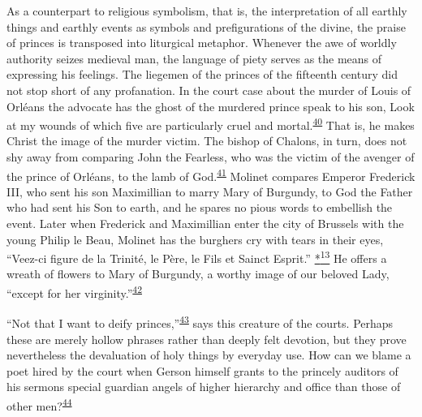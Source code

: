 As a counterpart to religious symbolism, that is, the interpretation of
all earthly things and earthly events as symbols and prefigurations of
the divine, the praise of princes is transposed into liturgical
metaphor. Whenever the awe of worldly authority seizes medieval man, the
language of piety serves as the means of expressing his feelings. The
liegemen of the princes of the fifteenth century did not stop short of
any profanation. In the court case about the murder of Louis of Orléans
the advocate has the ghost of the murdered prince speak to his son, Look
at my wounds of which five are particularly cruel and
mortal.\textsuperscript{\protect\hypertarget{13_Chapter_Six__THE_DEPICTION_OF_TH.xhtmlux5cux23id_1191}{\protect\hyperlink{23_NOTES.xhtmlux5cux23id_1192}{40}}}
That is, he makes Christ the image of the murder victim. The bishop of
Chalons, in turn, does not shy away from comparing John the Fearless,
who was the victim of the avenger of the prince of Orléans, to the lamb
of
God.\textsuperscript{\protect\hypertarget{13_Chapter_Six__THE_DEPICTION_OF_TH.xhtmlux5cux23id_1189}{\protect\hyperlink{23_NOTES.xhtmlux5cux23id_1190}{41}}}
Molinet compares Emperor Frederick III, who sent his son Maximillian to
marry Mary of Burgundy, to God the Father who had sent his Son to earth,
and he spares no pious words to embellish the event. Later when
Frederick and Maximillian enter the city of Brussels with the young
Philip le Beau, Molinet has the burghers cry with tears in their eyes,
``Veez-ci figure de la Trinité, le Père, le Fils et Sainct Esprit.''
\protect\hypertarget{13_Chapter_Six__THE_DEPICTION_OF_TH.xhtmlux5cux23id_3013}{\protect\hyperlink{23_NOTES.xhtmlux5cux23id_3014}{*\textsuperscript{13}}}
He offers a wreath of flowers to Mary of Burgundy, a worthy image of our
beloved Lady, ``except for her
virginity.''\textsuperscript{\protect\hypertarget{13_Chapter_Six__THE_DEPICTION_OF_TH.xhtmlux5cux23id_1187}{\protect\hyperlink{23_NOTES.xhtmlux5cux23id_1188}{42}}}

``Not that I want to deify
princes,''\textsuperscript{\protect\hypertarget{13_Chapter_Six__THE_DEPICTION_OF_TH.xhtmlux5cux23id_1185}{\protect\hyperlink{23_NOTES.xhtmlux5cux23id_1186}{43}}}
says this creature of the courts. Perhaps these are merely hollow
phrases rather than deeply felt devotion, but they prove nevertheless
the devaluation of holy things by everyday use. How can we blame a poet
hired by the court when Gerson himself grants to the princely auditors
of his sermons special guardian angels of higher hierarchy and office
than those of other
men?\textsuperscript{\protect\hypertarget{13_Chapter_Six__THE_DEPICTION_OF_TH.xhtmlux5cux23id_1183}{\protect\hyperlink{23_NOTES.xhtmlux5cux23id_1184}{44}}}

